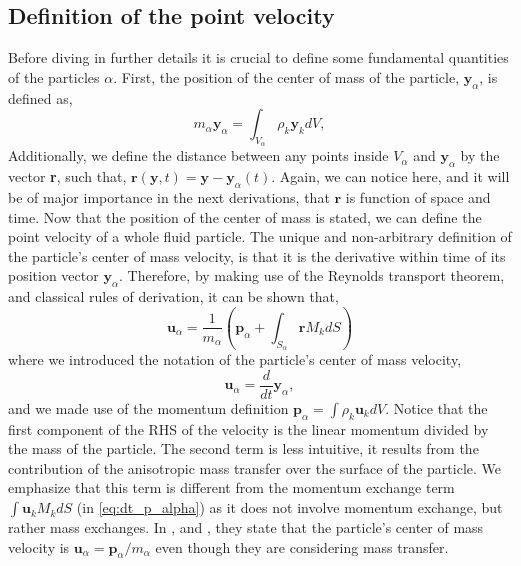 \documentclass[twocolumn]{My_article}
\newcommand{\ddt}{\frac{d}{d t}}
\newcommand{\tb}[1]{\color{blue}#1\color{black}}
\begin{document}
\subsection{Definition of the point velocity}
Before diving in further details it is crucial to define some fundamental quantities of the particles $\alpha$.
First, the position of the center of mass of the particle, $\textbf{y}_\alpha$, is defined as,
\begin{equation*}
    m_\alpha \textbf{y}_\alpha
    = \int_{V_\alpha} \rho_k \textbf{y}_k dV,
\end{equation*}
Additionally, we define the distance between any points inside $V_\alpha$ and $\textbf{y}_\alpha$ by the vector \textbf{r}, such that, $\textbf{r}(\textbf{y},t) = \textbf{y} - \textbf{y}_\alpha(t)$.
Again, we can notice here, and it will be of major importance in the next derivations, that $\textbf{r}$ is function of space and time.
Now that the position of the center of mass is stated, we can define the point velocity of a whole fluid particle.
The unique and non-arbitrary definition of the particle's center of mass velocity, is that it is the derivative within time of its position vector $\textbf{y}_\alpha$.
Therefore, by making use of the Reynolds transport theorem, and classical rules of derivation, it can be shown that,
\tb{
    \begin{equation}
        \textbf{u}_\alpha
        = \frac{1}{m_\alpha} \left(
            \textbf{p}_\alpha
            +  \int_{S_\alpha} \textbf{r} M_k dS
            \right)
            \label{eq:dt_y_alpha}
    \end{equation}
}
where we introduced the notation of the particle's center of mass velocity,
\begin{equation*}
    \textbf{u}_\alpha = \ddt \textbf{y}_\alpha,
\end{equation*}
and we made use of the momentum definition $\textbf{p}_\alpha = \int \rho_k \textbf{u}_k dV$.
Notice that the first component of the RHS of the velocity is the linear momentum divided by the mass of the particle.
The second term is less intuitive, it results from the contribution of the anisotropic mass transfer over the surface of the particle.
We emphasize that this term is different from the momentum exchange term $\int \textbf{u}_kM_k dS$ (in \ref{eq:dt_p_alpha}) as it does not involve momentum exchange, but rather mass exchanges.
In \citet{zaepffel2011modelisation}, \citet{paisant2014modelisation} and \citet{morel2015mathematical}, they state that the particle's center of mass velocity is $\textbf{u}_\alpha = \textbf{p}_\alpha / m_\alpha$ even though they are considering mass transfer.
\end{document}
